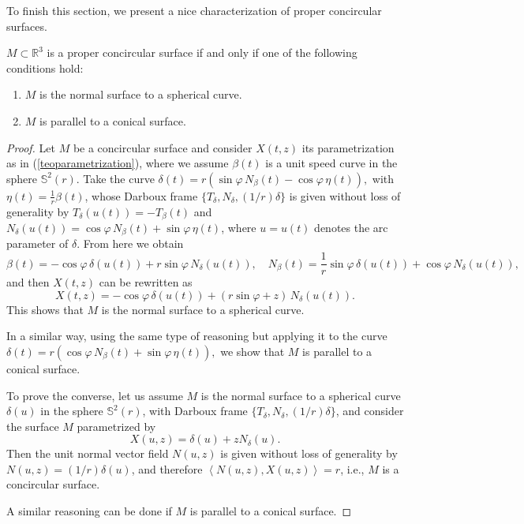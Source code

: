 \documentclass[eqnumis, pdf]{hjms}
\def\R#1{\ensuremath{\mathbb{R}^{#1}}}
\def\S#1{\ensuremath{\mathbb{S}^{#1}}}
\def\<{\left<}
\def\>{\right>}
\begin{document}
To finish this section, we present a nice characterization of proper concircular surfaces.
\begin{theorem}\label{sctheo2}
$M\subset\R3$ is a proper concircular surface if and only if one of the following conditions hold:\vspace*{-\topsep}
\begin{enumerate}\itemsep0pt
\item[$1)$] $M$ is the normal surface to a spherical curve.
\item[$2)$] $M$ is parallel to a conical surface.
\end{enumerate}
\end{theorem}
\begin{proof}
Let $M$ be a concircular surface and consider $X(t,z)$ its parametrization as in (\ref{teoparametrization}), where we assume $\beta(t)$ is a unit speed curve in the sphere $\S2(r)$. Take the curve
\(
\delta(t)=r(\sin\varphi\, N_\beta(t)-\cos\varphi\, \eta(t)),
\)
with $\eta(t)=\frac1r\beta(t)$,
whose Darboux frame $\{T_\delta,N_\delta,(1/r)\delta\}$
is given without loss of generality by
$T_\delta(u(t))=-T_\beta(t)$ and
$N_\delta(u(t))=\cos\varphi\, N_\beta(t)+\sin\varphi\,\eta(t)$,
where $u=u(t)$ denotes the arc parameter of $\delta$. From here we obtain
\[
\beta(t)=-\cos\varphi\,\delta(u(t))+r\sin\varphi\,N_\delta(u(t)),\quad
N_\beta(t)=\frac1r\sin\varphi\,\delta(u(t))+\cos\varphi\,N_\delta(u(t)),
\]
and then $X(t,z)$ can be rewritten as
\[
X(t,z)=-\cos\varphi\,\delta(u(t))+(r\sin\varphi+z)\,N_\delta(u(t)).
\]
This shows that $M$ is the normal surface to a spherical curve.\par
In a similar way, using the same type of reasoning but applying it to the curve
\(
\delta(t)=r(\cos\varphi\, N_\beta(t)+\sin\varphi\, \eta(t)),
\)
we show that $M$ is parallel to a conical surface.\par
To prove the converse, let us assume $M$ is the normal surface to a spherical curve  $\delta(u)$ in the sphere $\S2(r)$, with Darboux frame $\{T_\delta,N_\delta,(1/r)\delta\}$, and consider the surface $M$ parametrized by
\[
X(u,z)=\delta(u)+zN_\delta(u).
\]
Then the unit normal vector field $N(u,z)$ is given without loss of generality by $N(u,z)=(1/r)\delta(u)$, and therefore $\<N(u,z),X(u,z)\>=r$, i.e., $M$ is a concircular surface.\par
A similar reasoning can be done if $M$ is parallel to a conical surface.
\end{proof}
\end{document}
